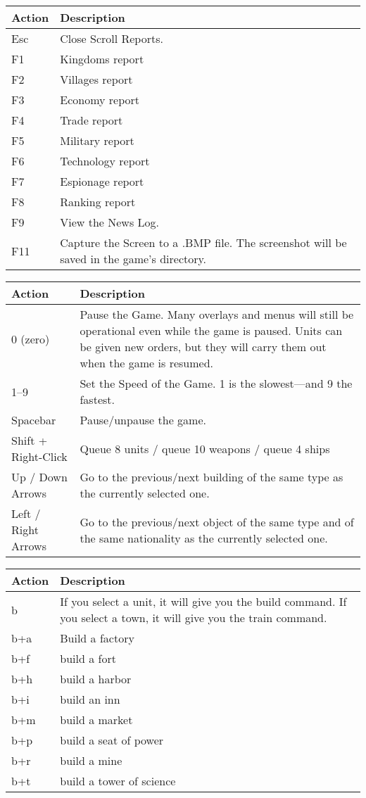 \begin{tabular}{ | l | p{6cm} |}
	\hline	 
	Action	& Description \\ \hline
	Esc	& Close Scroll Reports. \\ \hline
	F1	& Kingdoms report \\ \hline
	F2	& Villages report \\ \hline
	F3	& Economy report \\ \hline
	F4	& Trade report \\ \hline
	F5	& Military report \\ \hline
	F6	& Technology report \\ \hline
	F7	& Espionage report \\ \hline
	F8	& Ranking report \\ \hline
	F9	& View the News Log. \\ \hline
	F11	& Capture the Screen to a .BMP file. The screenshot will be saved in the game’s directory. \\ \hline
\end{tabular}
	
	\begin{tabular}{ | l | p{6cm} |}
		\hline	 
		Action	& Description \\ \hline
	0 (zero)	& Pause the Game. Many overlays and menus will still be operational even while the game is paused. Units can be given new orders, but they will carry them out when the game is resumed. \\ \hline
	1--9	& Set the Speed of the Game. 1 is the slowest---and 9 the fastest. \\ \hline
	Spacebar	& Pause/unpause the game. \\ \hline
	Shift + Right-Click	& Queue 8 units / queue 10 weapons / queue 4 ships \\ \hline
	Up / Down Arrows	& Go to the previous/next building of the same type as the currently selected one. \\ \hline
	Left / Right Arrows	& Go to the previous/next object of the same type and of the same nationality as the currently selected one. \\ \hline
\end{tabular}

\begin{tabular}{ | l | p{10cm} |}
	\hline	 
	Action	& Description \\ \hline
	b	& If you select a unit, it will give you the build command. If you select a town, it will give you the train command. \\ \hline
	b+a	& Build a factory \\ \hline
	b+f	& build a fort \\ \hline
	b+h	& build a harbor \\ \hline
	b+i	& build an inn \\ \hline
	b+m	& build a market \\ \hline
	b+p	& build a seat of power \\ \hline
	b+r	& build a mine \\ \hline
	b+t	& build a tower of science \\ \hline
\end{tabular}
	
